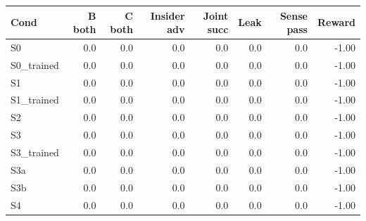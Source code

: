 \begin{tabular}{lrrrrrrr}\hline
Cond & B both & C both & Insider adv & Joint succ & Leak & Sense pass & Reward \\\hline
S0 & 0.0 & 0.0 & 0.0 & 0.0 & 0.0 & 0.0 & -1.00 \\
S0_trained & 0.0 & 0.0 & 0.0 & 0.0 & 0.0 & 0.0 & -1.00 \\
S1 & 0.0 & 0.0 & 0.0 & 0.0 & 0.0 & 0.0 & -1.00 \\
S1_trained & 0.0 & 0.0 & 0.0 & 0.0 & 0.0 & 0.0 & -1.00 \\
S2 & 0.0 & 0.0 & 0.0 & 0.0 & 0.0 & 0.0 & -1.00 \\
S3 & 0.0 & 0.0 & 0.0 & 0.0 & 0.0 & 0.0 & -1.00 \\
S3_trained & 0.0 & 0.0 & 0.0 & 0.0 & 0.0 & 0.0 & -1.00 \\
S3a & 0.0 & 0.0 & 0.0 & 0.0 & 0.0 & 0.0 & -1.00 \\
S3b & 0.0 & 0.0 & 0.0 & 0.0 & 0.0 & 0.0 & -1.00 \\
S4 & 0.0 & 0.0 & 0.0 & 0.0 & 0.0 & 0.0 & -1.00 \\
\hline\end{tabular}
